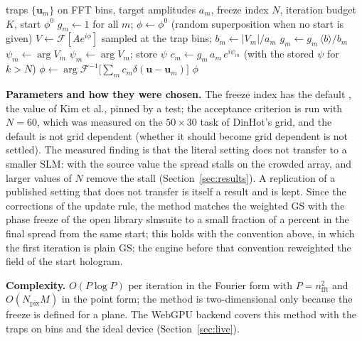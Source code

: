 \begin{algorithm}[t]
\caption{Phase-fixed weighted GS in the Fourier form. The weights $g$ are updated at every iteration but the first, which projects the field of the start hologram with $g=1$; the focal phase $\psi$ is recomputed until iteration $N$ and then kept.}
\label{alg:m07}
\begin{algorithmic}[1]
\Require traps $\{\mathbf u_m\}$ on FFT bins, target amplitudes $a_m$, freeze index $N$, iteration budget $K$, start $\phi^0$
\State $g_m\gets 1$ for all $m$; $\phi\gets\phi^0$ (random superposition when no start is given)
  \State $V\gets\mathcal F[A e^{i\phi}]$ sampled at the trap bins; $b_m\gets|V_m|/a_m$
   \State $g_m\gets g_m\,\langle b\rangle/b_m$ \EndIf
   \State $\psi_m\gets\arg V_m$  \State $\psi_m\gets\arg V_m$; store $\psi$ \EndIf
  \State $c_m\gets g_m\,a_m\,e^{i\psi_m}$ (with the stored $\psi$ for $k>N$)
  \State $\phi\gets\arg\mathcal F^{-1}\big[\sum_m c_m\delta(\mathbf u-\mathbf u_m)\big]$
\EndFor
\State \Return $\phi$
\end{algorithmic}
\end{algorithm}

\textbf{Parameters and how they were chosen.} The freeze index has the default , the value of Kim et al., pinned by a test; the acceptance criterion is run with $N=60$, which was measured on the $50\times30$ task of DinHot's grid, and the default is not grid dependent (whether it should become grid dependent is not settled). The measured finding is that the literal setting does not transfer to a smaller SLM: with the source value the spread stalls on the crowded array, and larger values of $N$ remove the stall (Section~\ref{sec:results}). A replication of a published setting that does not transfer is itself a result and is kept. Since the corrections of the update rule, the method matches the weighted GS with the phase freeze of the open library slmsuite to a small fraction of a percent in the final spread from the same start; this holds with the convention above, in which the first iteration is plain GS; the engine before that convention reweighted the field of the start hologram.

\textbf{Complexity.} $O(P\log P)$ per iteration in the Fourier form with $P=n_{\mathrm{fft}}^2$ and $O(N_{\mathrm{pix}}M)$ in the point form; the method is two-dimensional only because the freeze is defined for a plane. The WebGPU backend covers this method with the traps on bins and the ideal device (Section~\ref{sec:live}).

